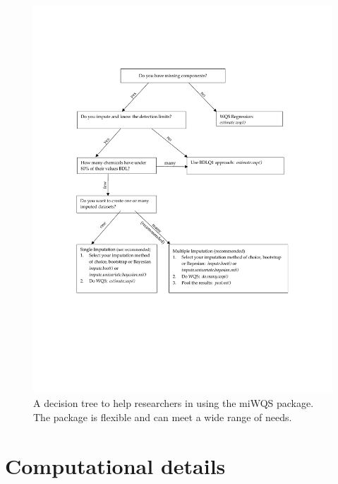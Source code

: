 \begin{figure}[h]

{\centering \includegraphics[width=1\linewidth]{figure-word/decision_tree.pdf} 

}

\caption{\label{fig::decide} A decision tree to help researchers in using the miWQS package. The package is flexible and can meet a wide range of needs.}\label{fig:fig.decide}
\end{figure}


\hypertarget{computational-details}{%
\section{Computational details}\label{computational-details}}

